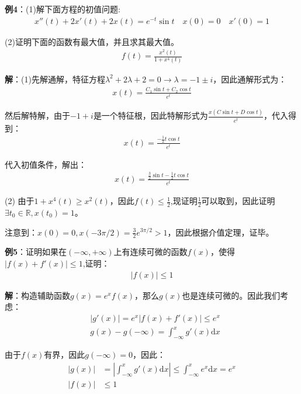 \documentclass{ctexart}
\let\oldtextbf\textbf
\renewcommand{\textbf}[1]{\textcolor{brown!50!red}{\oldtextbf{#1}}}
\begin{document}
\textbf{\color{brown!50!red}例4}：(1)解下面方程的初值问题:
\begin{align*}
    x''(t)+2x'(t)+2x(t)=e^{-t}\sin t\quad x(0)=0\quad x'(0)=1 
\end{align*}

(2)证明下面的函数有最大值，并且求其最大值。
\begin{align*}
   f(t)=\frac{x^2(t)}{1+x^4(t)} 
\end{align*}

\textbf{\color{brown!50!red}解}：(1)先解通解，特征方程$\lambda^2+2\lambda+2=0\to \lambda=-1\pm i$，因此通解形式为：
\begin{align*}
   x(t)=\frac{C_1\sin t+C_2\cos t}{e^{t}} 
\end{align*}

然后解特解，由于$-1+i$是一个特征根，因此特解形式为$\frac{x(C\sin t+D\cos t)}{e^t}$，代入得到：
\begin{align*}
   x(t)=\frac{-\frac{1}{2}t\cos t }{e^t} 
\end{align*}

代入初值条件，解出：
\begin{align*}
   x(t)=\frac{\frac{3}{2}\sin t -\frac{1}{2}t\cos t }{e^t} 
\end{align*}

(2) 由于$1+x^4(t)\geq x^2(t)$，因此$f(t)\leq \frac{1}{2}$,现证明$\frac{1}{2}$可以取到，因此证明$\exists t_0\in\mathbb{R},x(t_0)=1$。

注意到：$x(0)=0,x(-3\pi/2)=\frac{3}{2}e^{3\pi/2}>1$，因此根据介值定理，证毕。

\textbf{\color{brown!50!red}例5}：证明如果在$(-\infty,+\infty)$上有连续可微的函数$f(x)$，使得$|f(x)+f'(x)|\leq 1$,证明：
\begin{align*}
    |f(x)|\leq 1
\end{align*}

\textbf{\color{brown!50!red}解}：构造辅助函数$g(x)=e^xf(x)$，那么$g(x)$也是连续可微的。因此我们考虑：
\begin{align*}
   &|g'(x)|=e^x|f(x)+f'(x)|\leq e^x\\
&g(x)-g(-\infty)=\int_{-\infty}^xg'(x)\mathrm{d}x
\end{align*}

由于$f(x)$有界，因此$g(-\infty)=0$，因此：
\begin{align*} 
  | g(x)|&=|\int_{-\infty}^xg'(x)\mathrm{d}x|\leq\int_{-\infty}^x e^x\mathrm{d}x=e^x\\
|f(x)|&\leq 1
\end{align*}
\end{document}
